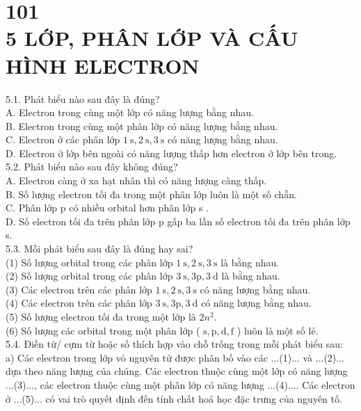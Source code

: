 \documentclass[10pt]{article}
\begin{document}
\section*{101 \\
 5 LỚP, PHÂN LỚP VÀ CẤU HÌNH ELECTRON}
5.1. Phát biểu nào sau đây là đúng?\\
A. Electron trong cùng một lớp có năng lượng bằng nhau.\\
B. Electron trong cùng một phân lớp có năng lượng bằng nhau.\\
C. Electron ở các phân lớp $1 \mathrm{~s}, 2 \mathrm{~s}, 3 \mathrm{~s}$ có năng lượng bằng nhau.\\
D. Electron ở lớp bên ngoài có năng lượng thấp hơn electron ở lớp bên trong.\\
5.2. Phát biểu nào sau đây không đúng?\\
A. Electron càng ở xa hạt nhân thì có năng lượng càng thấp.\\
B. Số lượng electron tối đa trong một phân lớp luôn là một số chẵn.\\
C. Phân lớp p có nhiều orbital hơn phân lớp s .\\
D. Số electron tối đa trên phân lớp p gấp ba lần số electron tối đa trên phân lớp s.\\
5.3. Mỗi phát biểu sau đây là đúng hay sai?\\
(1) Số lượng orbital trong các phân lớp $1 \mathrm{~s}, 2 \mathrm{~s}, 3 \mathrm{~s}$ là bằng nhau.\\
(2) Số lượng orbital trong các phân lớp $3 \mathrm{~s}, 3 \mathrm{p}, 3 \mathrm{~d}$ là bằng nhau.\\
(3) Các electron trên các phân lớp $1 \mathrm{~s}, 2 \mathrm{~s}, 3 \mathrm{~s}$ có năng lượng bằng nhau.\\
(4) Các electron trên các phân lớp $3 \mathrm{~s}, 3 \mathrm{p}, 3 \mathrm{~d}$ có năng lượng bằng nhau.\\
(5) Số lượng electron tối đa trong một lớp là $2 n^{2}$.\\
(6) Số lượng các orbital trong một phân lớp ( $\mathrm{s}, \mathrm{p}, \mathrm{d}, \mathrm{f}$ ) luôn là một số lẻ.\\
5.4. Điền từ/ cựm từ hoặc số thích hợp vào chỗ trống trong mỗi phát biểu sau:\\
a) Các electron trong lớp vỏ nguyên tử được phân bố vào các ...(1)... và ...(2)... dựa theo năng lượng của chúng. Các electron thuộc cùng một lớp có năng lượng ...(3)..., các electron thuộc cùng một phân lớp có năng lượng ...(4).... Các electron ở ...(5)... có vai trò quyết định đến tính chất hoá học đặc trưng của nguyên tố.\\
\end{document}
